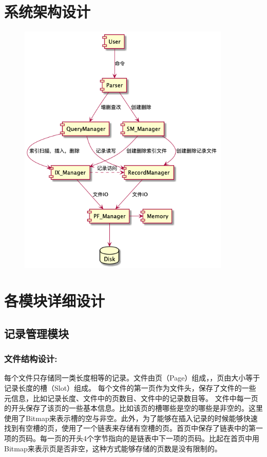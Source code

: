 \documentclass[11pt,UTF8]{report}
\begin{document}
\section{系统架构设计}
\begin{figure}[!ht]
	\centering
	\includegraphics[width=0.9\textwidth]{structure}
\end{figure}
\section{各模块详细设计}
\subsection{记录管理模块}
\subsubsection{文件结构设计:}
每个文件只存储同一类长度相等的记录。文件由页（Page）组成，，页由大小等于记录长度的槽（Slot）组成。
每个文件的第一页作为文件头，保存了文件的一些元信息，比如记录长度、文件中的页数目、文件中的记录数目等。
文件中每一页的开头保存了该页的一些基本信息。比如该页的槽哪些是空的哪些是非空的。这里使用了Bitmap来表示槽的空与非空。此外，为了能够在插入记录的时候能够快速找到有空槽的页，使用了一个链表来存储有空槽的页。首页中保存了链表中的第一项的页码。每一页的开头4个字节指向的是链表中下一项的页码。比起在首页中用Bitmap来表示页是否非空，这种方式能够存储的页数是没有限制的。
\end{document}
